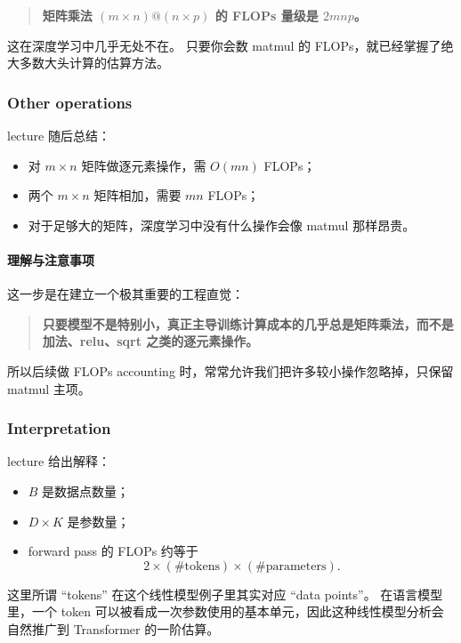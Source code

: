 \documentclass[a4paper,UTF8]{article}
\numberwithin{equation}{section}
\begin{document}
\begin{quote}
\textbf{矩阵乘法 \((m \times n) @ (n \times p)\) 的 FLOPs 量级是 \(2mnp\)。}
\end{quote}

这在深度学习中几乎无处不在。  
只要你会数 matmul 的 FLOPs，就已经掌握了绝大多数大头计算的估算方法。

\subsubsection{Other operations}

lecture 随后总结：
\begin{itemize}
    \item 对 \(m \times n\) 矩阵做逐元素操作，需 \(O(mn)\) FLOPs；
    \item 两个 \(m \times n\) 矩阵相加，需要 \(mn\) FLOPs；
    \item 对于足够大的矩阵，深度学习中没有什么操作会像 matmul 那样昂贵。
\end{itemize}

\paragraph{理解与注意事项}
这一步是在建立一个极其重要的工程直觉：

\begin{quote}
\textbf{只要模型不是特别小，真正主导训练计算成本的几乎总是矩阵乘法，而不是加法、relu、sqrt 之类的逐元素操作。}
\end{quote}

所以后续做 FLOPs accounting 时，常常允许我们把许多较小操作忽略掉，只保留 matmul 主项。

\subsubsection{Interpretation}

lecture 给出解释：
\begin{itemize}
    \item \(B\) 是数据点数量；
    \item \(D \times K\) 是参数量；
    \item forward pass 的 FLOPs 约等于
    \[
    2 \times (\#\text{tokens}) \times (\#\text{parameters}).
    \]
\end{itemize}

这里所谓 ``tokens'' 在这个线性模型例子里其实对应 ``data points''。  
在语言模型里，一个 token 可以被看成一次参数使用的基本单元，因此这种线性模型分析会自然推广到 Transformer 的一阶估算。
\end{document}
